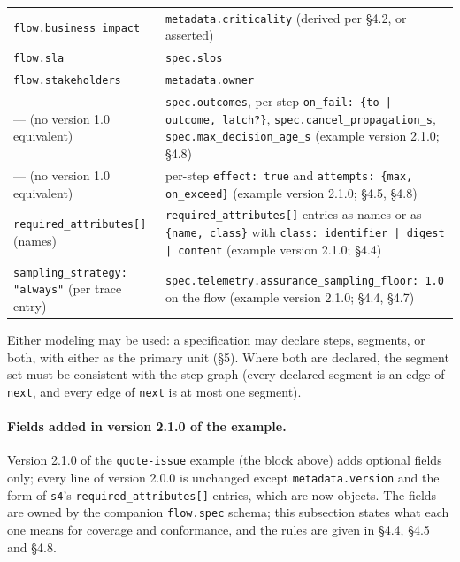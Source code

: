 \documentclass[11pt]{article}
\newcommand{\code}[1]{\texttt{#1}}
\begin{document}
\begin{center}
\begin{tabular}{@{}p{4.6cm} p{11.0cm}@{}}
\code{flow.business\_impact} & \code{metadata.criticality} (derived per \S4.2, or asserted) \\
\code{flow.sla} & \code{spec.slos} \\
\code{flow.stakeholders} & \code{metadata.owner} \\
--- (no version 1.0 equivalent) & \code{spec.outcomes}, per-step \code{on\_fail: \{to | outcome, latch?\}}, \code{spec.cancel\_propagation\_s}, \code{spec.max\_decision\_age\_s} (example version 2.1.0; \S4.8) \\
--- (no version 1.0 equivalent) & per-step \code{effect: true} and \code{attempts: \{max, on\_exceed\}} (example version 2.1.0; \S4.5, \S4.8) \\
\code{required\_attributes[]} (names) & \code{required\_attributes[]} entries as names or as \code{\{name, class\}} with \code{class: identifier | digest | content} (example version 2.1.0; \S4.4) \\
\code{sampling\_strategy: "always"} (per trace entry) & \code{spec.telemetry.assurance\_sampling\_floor: 1.0} on the flow (example version 2.1.0; \S4.4, \S4.7) \\
\bottomrule
\end{tabular}
\end{center}

Either modeling may be used: a specification may declare steps, segments, or both, with either as the primary unit (\S5). Where both are declared, the segment set must be consistent with the step graph (every declared segment is an edge of \code{next}, and every edge of \code{next} is at most one segment).

\paragraph{Fields added in version 2.1.0 of the example.}
Version 2.1.0 of the \code{quote-issue} example (the block above) adds optional fields only; every line of version 2.0.0 is unchanged except \code{metadata.version} and the form of \code{s4}'s \code{required\_attributes[]} entries, which are now objects. The fields are owned by the companion \code{flow.spec} schema; this subsection states what each one means for coverage and conformance, and the rules are given in \S4.4, \S4.5 and \S4.8.
\end{document}
